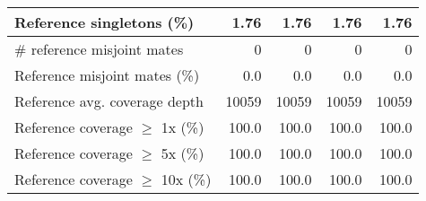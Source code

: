 \documentclass[12pt,a4paper]{article}
\begin{document}
\begin{table}[ht]
\begin{center}
\begin{tabular}{|l*{4}{|r}|}
Reference singletons (\%) & 1.76 & 1.76 & 1.76 & 1.76 \\ \hline
\# reference misjoint mates & 0 & 0 & 0 & 0 \\ \hline
Reference misjoint mates (\%) & 0.0 & 0.0 & 0.0 & 0.0 \\ \hline
Reference avg. coverage depth & 10059 & 10059 & 10059 & 10059 \\ \hline
Reference coverage $\geq$ 1x (\%) & 100.0 & 100.0 & 100.0 & 100.0 \\ \hline
Reference coverage $\geq$ 5x (\%) & 100.0 & 100.0 & 100.0 & 100.0 \\ \hline
Reference coverage $\geq$ 10x (\%) & 100.0 & 100.0 & 100.0 & 100.0 \\ \hline
\end{tabular}
\end{center}
\end{table}
\end{document}
